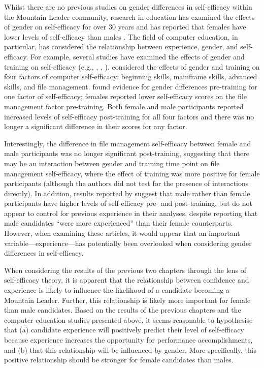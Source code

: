 \documentclass[
  12pt,
  a4paper,
]{book}
\begin{document}
Whilst there are no previous studies on gender differences in self-efficacy within the Mountain Leader community, research in education has examined the effects of gender on self-efficacy for over 30 years and has reported that females have lower levels of self-efficacy than males \citep[e.g.,][]{Murphy1989, Klassen2010}. The field of computer education, in particular, has considered the relationship between experience, gender, and self-efficacy. For example, several studies have examined the effects of gender and training on self-efficacy (e.g., \citet{Cassidy2002}, \citet{Murphy1989}, \citet{Torkzadeh1994}). \citet{Torkzadeh1994} considered the effects of gender and training on four factors of computer self-efficacy: beginning skills, mainframe skills, advanced skills, and file management. \citet{Torkzadeh1994} found evidence for gender differences pre-training for one factor of self-efficacy; females reported lower self-efficacy scores on the file management factor pre-training. Both female and male participants reported increased levels of self-efficacy post-training for all four factors and there was no longer a significant difference in their scores for any factor.

Interestingly, the difference in file management self-efficacy between female and male participants was no longer significant post-training, suggesting that there may be an interaction between gender and training time point on file management self-efficacy, where the effect of training was more positive for female participants (although the authors did not test for the presence of interactions directly). In addition, results reported by \citet{Cassidy2002} suggest that male rather than female participants have higher levels of self-efficacy pre- and post-training, but do not appear to control for previous experience in their analyses, despite reporting that male candidates ``were more experienced'' than their female counterparts. However, when examining these articles, it would appear that an important variable---experience---has potentially been overlooked when considering gender differences in self-efficacy.

When considering the results of the previous two chapters through the lens of self-efficacy theory, it is apparent that the relationship between confidence and experience is likely to influence the likelihood of a candidate becoming a Mountain Leader. Further, this relationship is likely more important for female than male candidates. Based on the results of the previous chapters and the computer education studies presented above, it seems reasonable to hypothesise that (a) candidate experience will positively predict their level of self-efficacy because experience increases the opportunity for performance accomplishments, and (b) that this relationship will be influenced by gender. More specifically, this positive relationship should be stronger for female candidates than males.
\end{document}
